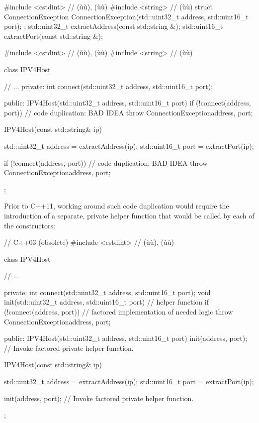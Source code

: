 \begin{emcppshiddenlisting}[emcppsbatch={e1,e2,e3,e4}]
#include <cstdint> // (ù{}ù), (ù{}ù)
#include <string>   // (ù{}ù)
struct ConnectionException {
    ConnectionException(std::uint32_t address, std::uint16_t port);
};
std::uint32_t extractAddress(const std::string &);
std::uint16_t extractPort(const std::string &);
\end{emcppshiddenlisting}
\begin{emcppslisting}[emcppsbatch=e1]
#include <cstdint>  // (ù{}ù), (ù{}ù)
#include <string>   // (ù{}ù)

class IPV4Host
{
     // ...
private:
    int connect(std::uint32_t address, std::uint16_t port);

public:
    IPV4Host(std::uint32_t address, std::uint16_t port)
    {
        if (!connect(address, port))  // code duplication: BAD IDEA
        {
            throw ConnectionException{address, port};
        }
    }

    IPV4Host(const std::string& ip)
    {
        std::uint32_t address = extractAddress(ip);
        std::uint16_t port = extractPort(ip);

        if (!connect(address, port))  // code duplication: BAD IDEA
        {
            throw ConnectionException{address, port};
        }
    }
};
\end{emcppslisting}

\noindent Prior to C++11, working around such code duplication would require the
introduction of a separate, private helper function that
would be called by each of the constructors:

\begin{emcppslisting}[emcppsbatch=e2]
// C++03 (obsolete)
#include <cstdint>  // (ù{}ù), (ù{}ù)

class IPV4Host
{
    // ...

private:
    int connect(std::uint32_t address, std::uint16_t port);
    void init(std::uint32_t address, std::uint16_t port)  // helper function
    {
        if (!connect(address, port))  // factored implementation of needed logic
        {
            throw ConnectionException{address, port};
        }
    }

public:
    IPV4Host(std::uint32_t address, std::uint16_t port)
    {
        init(address, port);  // Invoke factored private helper function.
    }

    IPV4Host(const std::string& ip)
    {
        std::uint32_t address = extractAddress(ip);
        std::uint16_t port = extractPort(ip);

        init(address, port);  // Invoke factored private helper function.
    }
};
\end{emcppslisting}

